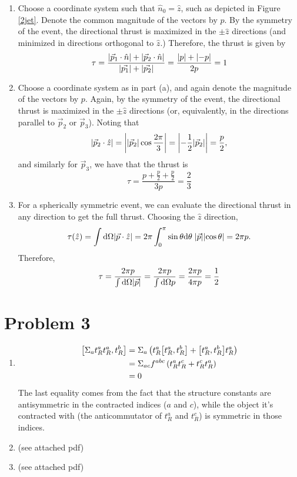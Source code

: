 \documentclass[12pt]{article}
\begin{document}
\begin{enumerate}[label=(\alph*)]
    \item
    Choose a coordinate system such that $\hat{n}_0 = \hat{z}$, such as depicted in Figure \ref{2jet}. Denote the common magnitude of the vectors by $p$. By the symmetry of the event, the directional thrust is maximized in the $\pm\hat{z}$ directions (and minimized in directions orthogonal to $\hat{z}$.) Therefore, the thrust is given by
    \[ \tau = \frac{\abs{\vec{p}_1\cdot\hat{n}} + \abs{\vec{p}_2\cdot\hat{n}}}{\abs{\vec{p_1}} + \abs{\vec{p_2}}} = \frac{\abs{p} + \abs{-p}}{2p} = 1  \] 

    \item
    Choose a coordinate system as in part (a), and again denote the magnitude of the vectors by $p$. Again, by the symmetry of the event, the directional thrust is maximized in the $\pm \hat{z}$ directions (or, equivalently, in the directions parallel to $\vec{p}_2$ or $\vec{p}_3$). Noting that 
    \[ \abs{\vec{p}_2\cdot\hat{z}} = \abs{\abs{\vec{p}_2}\cos\frac{2\pi}{3}} = \abs{-\frac{1}{2}\abs{\vec{p}_2}} = \frac{p}{2}, \]
    and similarly for $\vec{p}_3$, we have that the thrust is
    \[ \tau = \frac{p + \frac{p}{2} + \frac{p}{2}}{3p} = \frac{2}{3} \]

    \item
    For a spherically symmetric event, we can evaluate the directional thrust in any direction to get the full thrust. Choosing the $\hat{z}$ direction,
    \[ \tau(\hat{z}) = \int \dd\Omega \abs{\vec{p}\cdot\hat{z}} = 2\pi\int_0^\pi\sin\theta\dd\theta\;\abs{\vec{p}}\abs{\cos\theta} = 2\pi p. \]
    Therefore,
    \[ \tau = \frac{2\pi p}{\int\dd\Omega\abs{\vec{p}}} = \frac{2\pi p}{\int\dd\Omega p} = \frac{2\pi p}{4\pi p} = \frac{1}{2} \]
\end{enumerate}


\section*{Problem 3}
\begin{enumerate}[label=(\alph*)]
    \item 
    \begin{align*}
        \comm{\Sigma_at_R^at_R^a}{t_R^b} &= \Sigma_a\left(t_R^a\comm{t_R^a}{t_R^b} + \comm{t_R^a}{t_R^b}t_R^a\right) \\
        &= \Sigma_{ac}f^{abc}\left(t_R^at_R^c + t_R^ct_R^a\right) \\
        &= 0
    \end{align*}
    The last equality comes from the fact that the structure constants are antisymmetric in the contracted indices ($a$ and $c$), while the object it's contracted with (the anticommutator of $t_R^a$ and $t_R^c$) is symmetric in those indices.
    \item (see attached pdf)
    \item (see attached pdf)
\end{enumerate}

\end{document}
